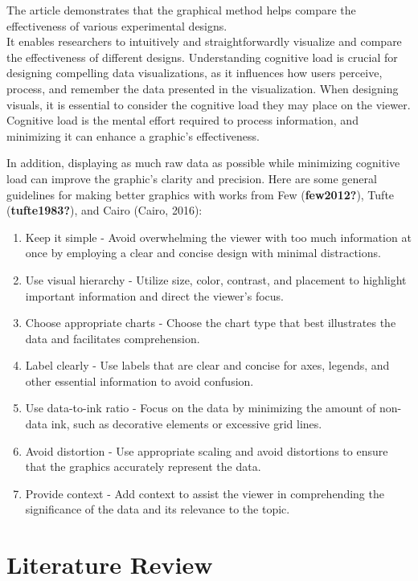 \documentclass[print]{nuthesis}
\begin{document}
The article demonstrates that the graphical method helps compare the effectiveness of various experimental designs.\\
It enables researchers to intuitively and straightforwardly visualize and compare the effectiveness of different designs.
Understanding cognitive load is crucial for designing compelling data visualizations, as it influences how users perceive, process, and remember the data presented in the visualization.
When designing visuals, it is essential to consider the cognitive load they may place on the viewer. Cognitive load is the mental effort required to process information, and minimizing it can enhance a graphic's effectiveness.

In addition, displaying as much raw data as possible while minimizing cognitive load can improve the graphic's clarity and precision.
Here are some general guidelines for making better graphics with works from Few (\textbf{few2012?}), Tufte (\textbf{tufte1983?}), and Cairo (Cairo, 2016):

\begin{enumerate}
\def\labelenumi{\arabic{enumi}.}
\item
  Keep it simple - Avoid overwhelming the viewer with too much information at once by employing a clear and concise design with minimal distractions.
\item
  Use visual hierarchy - Utilize size, color, contrast, and placement to highlight important information and direct the viewer's focus.
\item
  Choose appropriate charts - Choose the chart type that best illustrates the data and facilitates comprehension.
\item
  Label clearly - Use labels that are clear and concise for axes, legends, and other essential information to avoid confusion.
\item
  Use data-to-ink ratio - Focus on the data by minimizing the amount of non-data ink, such as decorative elements or excessive grid lines.
\item
  Avoid distortion - Use appropriate scaling and avoid distortions to ensure that the graphics accurately represent the data.
\item
  Provide context - Add context to assist the viewer in comprehending the significance of the data and its relevance to the topic.
\end{enumerate}

\hypertarget{literature-review}{%
\section{Literature Review}\label{literature-review}}
\end{document}
